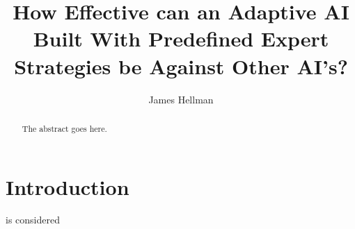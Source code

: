 \documentclass[journal]{IEEEtran}
\begin{document}
%
\title{How Effective can an Adaptive AI Built With Predefined Expert Strategies be Against Other AI’s?}
%
%
\author{James Hellman}


\maketitle

\begin{abstract}
The abstract goes here.
\end{abstract}

\section{Introduction}
% 
% 
% 
% 
 is considered  \cite{AIBook} \cite{Survey}
\end{document}
